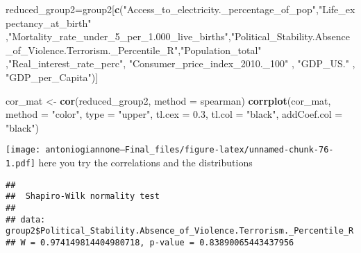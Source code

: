\documentclass[
]{article}
\newenvironment{Shaded}{\begin{snugshade}}{\end{snugshade}}
\newcommand{\AttributeTok}[1]{\textcolor[rgb]{0.13,0.29,0.53}{#1}}
\newcommand{\FloatTok}[1]{\textcolor[rgb]{0.00,0.00,0.81}{#1}}
\newcommand{\FunctionTok}[1]{\textcolor[rgb]{0.13,0.29,0.53}{\textbf{#1}}}
\newcommand{\NormalTok}[1]{#1}
\newcommand{\OtherTok}[1]{\textcolor[rgb]{0.56,0.35,0.01}{#1}}
\newcommand{\SpecialCharTok}[1]{\textcolor[rgb]{0.81,0.36,0.00}{\textbf{#1}}}
\newcommand{\StringTok}[1]{\textcolor[rgb]{0.31,0.60,0.02}{#1}}
\begin{document}
\begin{Shaded}
\begin{Highlighting}[]
\NormalTok{reduced\_group2}\OtherTok{=}\NormalTok{group2[}\FunctionTok{c}\NormalTok{(}\StringTok{"Access\_to\_electricity.\_percentage\_of\_pop"}\NormalTok{,}\StringTok{"Life\_expectancy\_at\_birth"}\NormalTok{  ,}\StringTok{"Mortality\_rate\_under\_5\_per\_1.000\_live\_births"}\NormalTok{,}\StringTok{"Political\_Stability.Absence\_of\_Violence.Terrorism.\_Percentile\_R"}\NormalTok{,}\StringTok{"Population\_total"}\NormalTok{ ,}\StringTok{"Real\_interest\_rate\_perc"}\NormalTok{, }\StringTok{"Consumer\_price\_index\_2010.\_100"}\NormalTok{ , }\StringTok{"GDP\_US."}\NormalTok{ , }\StringTok{"GDP\_per\_Capita"}\NormalTok{)]}


\NormalTok{cor\_mat }\OtherTok{\textless{}{-}} \FunctionTok{cor}\NormalTok{(reduced\_group2, }\AttributeTok{method =} \StringTok{\textquotesingle{}spearman\textquotesingle{}}\NormalTok{)}
\FunctionTok{corrplot}\NormalTok{(cor\_mat, }\AttributeTok{method =} \StringTok{"color"}\NormalTok{, }\AttributeTok{type =} \StringTok{"upper"}\NormalTok{, }\AttributeTok{tl.cex =} \FloatTok{0.3}\NormalTok{, }\AttributeTok{tl.col =} \StringTok{"black"}\NormalTok{, }\AttributeTok{addCoef.col =} \StringTok{"black"}\NormalTok{)}
\end{Highlighting}
\end{Shaded}

\texttt{[image: antoniogiannone---Final\_files/figure-latex/unnamed-chunk-76-1.pdf]}
here you try the correlations and the distributions

\begin{Shaded}
\end{Shaded}

\begin{verbatim}
## 
##  Shapiro-Wilk normality test
## 
## data:  group2$Political_Stability.Absence_of_Violence.Terrorism._Percentile_R
## W = 0.974149814404980718, p-value = 0.83890065443437956
\end{verbatim}

\begin{Shaded}
\end{Shaded}
\end{document}
